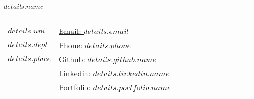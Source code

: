 \documentclass[letterpaper,11pt,oneside]{article}
\begin{document}
\noindent  \LARGE{\textbf{$details.name$}} \\
\vspace{-2ex} 
\hrule 
\normalsize

\begin{center}
\begin{tabular}{l l}
  $details.uni$   & \hspace{1in} \href{mailto:$details.email$}{Email: $details.email$} \\
  $details.dept$  & \hspace{1in}Phone: $details.phone$ \\
  $details.place$ & \hspace{1in} \href{$details.github.url$}{Github: $details.github.name$} \\
  & \hspace{1in} \href{$details.linkedin.url$}{Linkedin: $details.linkedin.name$} \\
  & \hspace{1in} \href{$details.portfolio.url$}{Portfolio: $details.portfolio.name$}
\end{tabular}
\end{center}

\vspace{1em}

\end{document}
